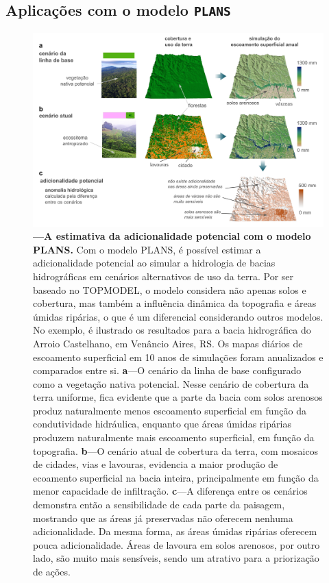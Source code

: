 \documentclass[./main.tex]{subfiles}
\begin{document}
\subsection{Aplicações com o modelo \texttt{PLANS}}

\begin{figure}[t!] 
\centering				
\includegraphics[width=0.98\linewidth]{figs/fig_addplans.jpg}		
\caption[Adicionalidade potencial com o modelo PLANS]
{\textbf{---\;A estimativa da adicionalidade potencial com o modelo PLANS.}
    Com o modelo PLANS, é possível estimar a adicionalidade potencial ao simular a hidrologia de bacias hidrográficas em cenários alternativos de uso da terra. Por ser baseado no TOPMODEL, o modelo considera não apenas solos e cobertura, mas também a influência dinâmica da topografia e áreas úmidas ripárias, o que é um diferencial considerando outros modelos. No exemplo, é ilustrado os resultados para a bacia hidrográfica do Arroio Castelhano, em Venâncio Aires, RS. Os mapas diários de escoamento superficial em 10 anos de simulações foram anualizados e comparados entre si.    
    \;\textbf{a}\;---\;O cenário da linha de base configurado como a vegetação nativa potencial. Nesse cenário de cobertura da terra uniforme, fica evidente que a parte da bacia com solos arenosos produz naturalmente menos escoamento superficial em função da condutividade hidráulica, enquanto que áreas úmidas ripárias produzem naturalmente mais escoamento superficial, em função da topografia.
    \;\textbf{b}\;---\;O cenário atual de cobertura da terra, com mosaicos de cidades, vias e lavouras, evidencia a maior produção de ecoamento superficial na bacia inteira, principalmente em função da menor capacidade de infiltração.    
    \;\textbf{c}\;---\;A diferença entre os cenários demonstra então a sensibilidade de cada parte da paisagem, mostrando que as áreas já preservadas não oferecem nenhuma adicionalidade. Da mesma forma, as áreas úmidas ripárias oferecem pouca adicionalidade. Áreas de lavoura em solos arenosos, por outro lado, são muito mais sensíveis, sendo um atrativo para a priorização de ações.
}
\label{fig:eco:addplans1} 		
\end{figure}
\end{document}
